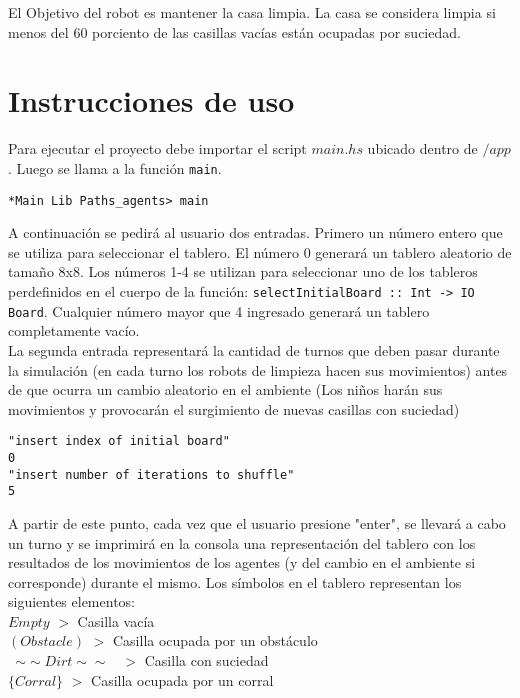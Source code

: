 \documentclass[a4paper,12pt]{article}
\def\code#1{\texttt{#1}}
\begin{document}
El Objetivo del robot es mantener la casa limpia. La casa se considera limpia si menos del 60 porciento de las casillas vacías están ocupadas por suciedad.

\section*{Instrucciones de uso}
Para ejecutar el proyecto debe importar el script $main.hs$ ubicado dentro de $/app$. Luego se llama a la función \code{main}.

\begin{lstlisting}
*Main Lib Paths_agents> main
\end{lstlisting}

A continuación se pedirá al usuario dos entradas. Primero un número entero que se utiliza para seleccionar el tablero. El
número 0 generará un tablero aleatorio de tamaño 8x8. Los números 1-4 se utilizan para seleccionar uno de los tableros perdefinidos en el cuerpo de la función: \code{selectInitialBoard :: Int -> IO Board}. Cualquier número mayor que 4 ingresado generará un tablero completamente vacío.\\
La segunda entrada representará la cantidad de turnos que deben pasar durante la simulación (en cada turno los robots de limpieza hacen sus movimientos) antes de que ocurra un cambio aleatorio en el ambiente (Los niños harán sus movimientos y provocarán el surgimiento de nuevas casillas con suciedad)

\begin{lstlisting}
"insert index of initial board"
0
"insert number of iterations to shuffle"
5
\end{lstlisting}

A partir de este punto, cada vez que el usuario presione "enter", se llevará a cabo un turno y se imprimirá en la consola una representación del tablero con los resultados de los movimientos de los agentes (y del cambio en el ambiente si corresponde) durante el mismo. Los símbolos en el tablero representan los siguientes elementos:\\

\code{$Empty$} $>$ Casilla vacía\\

\code{$(Obstacle)$} $>$ Casilla ocupada por un obstáculo\\

\code{ $\sim\sim Dirt \sim\sim$ } $>$ Casilla con suciedad\\

\code{$\{Corral\}$} $>$ Casilla ocupada por un corral\\
\end{document}
